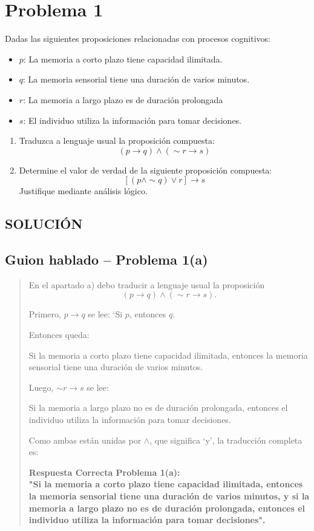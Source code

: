 \documentclass[12pt]{article}
\begin{document}
	\section*{Problema 1}
		
	Dadas las siguientes proposiciones relacionadas con procesos cognitivos:
	
	\begin{itemize}
		\item $p$: La memoria a corto plazo tiene capacidad ilimitada.			
		\item $q$: La memoria sensorial tiene una duración de varios minutos.		
		\item $r$: La memoria a largo plazo es de duración prolongada			
		\item $s$: El individuo utiliza la información para tomar decisiones.
		
	\end{itemize}
	
	\begin{enumerate}[label=\alph*)]
		\item Traduzca a lenguaje usual la proposición compuesta:
		\[
		(p \rightarrow q) \land (\sim r \rightarrow s)
		\]
		
		\item Determine el valor de verdad de la siguiente proposición compuesta:
		\[
		[(p \land \sim q) \lor r] \rightarrow s
		\]
		Justifique mediante análisis lógico.
	\end{enumerate}

	\subsection*{\textbf \Large SOLUCIÓN}
	\subsection*{Guion hablado -- Problema 1(a)}
	
	\begin{quote}
		En el apartado a) debo traducir a lenguaje usual la proposición
		\[
		(p \to q)\land(\sim r \to s).
		\]
		
		Primero, \(p \to q\) se lee: ‘Si \(p\), entonces \(q\).
		
		Entonces queda:
		
		Si la memoria a corto plazo tiene capacidad ilimitada, entonces la memoria sensorial tiene una duración de varios minutos.
				
		Luego, \(\sim r \to s\) se lee:
		
		Si la memoria a largo plazo no es de duración prolongada, entonces el individuo utiliza la información para tomar decisiones.
		
		Como ambas están unidas por \(\land\), que significa ‘y’, la traducción completa es:
		
		\textbf{Respuesta Correcta Problema 1(a): \\ "Si la memoria a corto plazo tiene capacidad ilimitada, entonces la memoria sensorial tiene una duración de varios minutos, y si la memoria a largo plazo no es de duración prolongada, entonces el individuo utiliza la información para tomar decisiones".}
	\end{quote}
	
\end{document}
